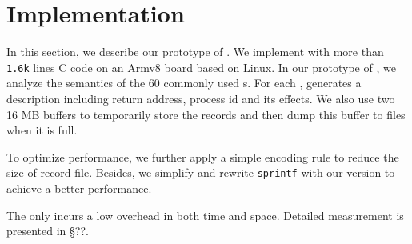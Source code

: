 \section{Implementation}

In this section, we describe our prototype of \TheName. We implement \TheName
with more than \texttt{1.6k} lines C code
on an Armv8 board based on Linux. In our prototype of \TheName, we analyze the semantics of the 60 commonly used
\syscall{}s. For each \syscall{}, \TheName generates a description including  return address, process id and its effects. We also use two 16 MB buffers to temporarily store
the \syscall{} records and then dump this buffer to files when it is full. 

To optimize performance, we further apply a simple encoding rule to reduce the size of record file. Besides, we simplify and rewrite \texttt{sprintf} with our version to achieve a better performance.

The \TheName only incurs a low overhead in both time and space. Detailed measurement is presented
in \S ??.








